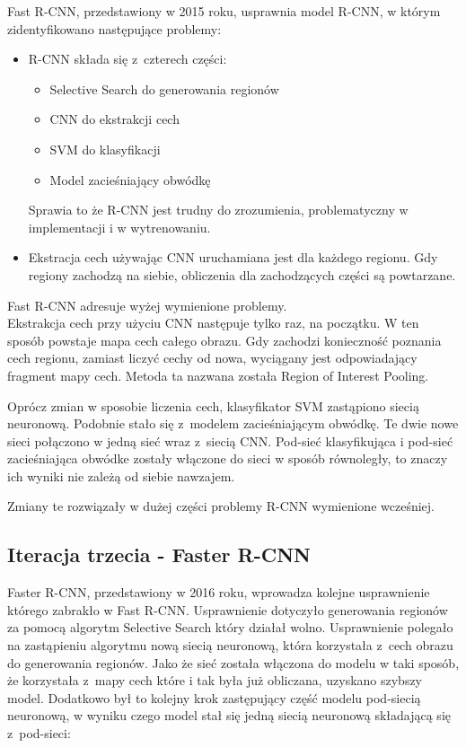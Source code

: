 
Fast R-CNN, przedstawiony w 2015 roku, usprawnia model R-CNN, w którym zidentyfikowano następujące problemy:

\begin{itemize}
	\item R-CNN składa się z~czterech części:
		\begin{itemize}
			\item Selective Search do generowania regionów
			\item CNN do ekstrakcji cech
			\item SVM do klasyfikacji
			\item Model zacieśniający obwódkę
		\end{itemize}
		Sprawia to że R-CNN jest trudny do zrozumienia, problematyczny w implementacji i w wytrenowaniu.
  \item Ekstracja cech używając CNN uruchamiana jest dla każdego regionu.
        Gdy regiony zachodzą na siebie, obliczenia dla zachodzących części są powtarzane.
\end{itemize}

Fast R-CNN adresuje wyżej wymienione problemy. \\

Ekstrakcja cech przy użyciu CNN następuje tylko raz, na początku.
W ten sposób powstaje mapa cech całego obrazu.
Gdy zachodzi konieczność poznania cech regionu, zamiast liczyć cechy od nowa, wyciągany jest odpowiadający fragment mapy cech.
Metoda ta nazwana została Region of Interest Pooling.

Oprócz zmian w sposobie liczenia cech, klasyfikator SVM zastąpiono siecią neuronową.
Podobnie stało się z~modelem zacieśniającym obwódkę.
Te dwie nowe sieci połączono w jedną sieć wraz z~siecią CNN.
Pod-sieć klasyfikująca i pod-sieć zacieśniająca obwódke zostały włączone do sieci w sposób równoległy, to znaczy ich wyniki nie zależą od siebie nawzajem.

Zmiany te rozwiązały w dużej części problemy R-CNN wymienione wcześniej.

\subsection{Iteracja trzecia - Faster R-CNN}


Faster R-CNN, przedstawiony w 2016 roku, wprowadza kolejne usprawnienie którego zabrakło w Fast R-CNN.
Usprawnienie dotyczyło generowania regionów za pomocą algorytm Selective Search który działał wolno.
Usprawnienie polegało na zastąpieniu algorytmu nową siecią neuronową, która korzystała z~cech obrazu do generowania regionów.
Jako że sieć została włączona do modelu w taki sposób, że korzystała z~mapy cech które i tak była już obliczana, uzyskano szybszy model.
Dodatkowo był to kolejny krok zastępujący część modelu pod-siecią neuronową, w wyniku czego model stał się jedną siecią neuronową składającą się z~pod-sieci:

